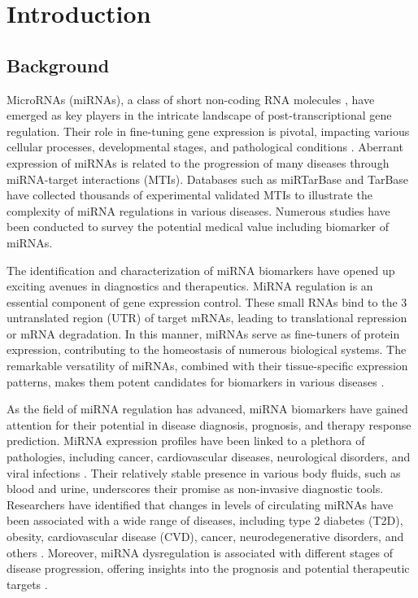 \chapter{Introduction}
\label{chp:introduction}

\section{Background}

MicroRNAs (miRNAs), a class of short non-coding RNA molecules \cite{bartel2004microrna}, have emerged as key players in the intricate landscape of post-transcriptional gene regulation. Their role in fine-tuning gene expression is pivotal, impacting various cellular processes, developmental stages, and pathological conditions \cite{bartel2004microrna,balasubr2013developm}. Aberrant expression of miRNAs is related to the progression of many diseases through miRNA-target interactions (MTIs). Databases such as miRTarBase \cite{huang2022mirtarba} and TarBase \cite{karagkou2018diana} have collected thousands of experimental validated MTIs to illustrate the complexity of miRNA regulations in various diseases. Numerous studies have been conducted to survey the potential medical value including biomarker of miRNAs.

The identification and characterization of miRNA biomarkers have opened up exciting avenues in diagnostics and therapeutics. MiRNA regulation is an essential component of gene expression control. These small RNAs bind to the 3\textquotesingle{} untranslated region (UTR) of target mRNAs, leading to translational repression or mRNA degradation. In this manner, miRNAs serve as fine-tuners of protein expression, contributing to the homeostasis of numerous biological systems. The remarkable versatility of miRNAs, combined with their tissue-specific expression patterns, makes them potent candidates for biomarkers in various diseases \cite{krol2010widespre}.

As the field of miRNA regulation has advanced, miRNA biomarkers have gained attention for their potential in disease diagnosis, prognosis, and therapy response prediction. MiRNA expression profiles have been linked to a plethora of pathologies, including cancer, cardiovascular diseases, neurological disorders, and viral infections \cite{mori2019extracel}. Their relatively stable presence in various body fluids, such as blood and urine, underscores their promise as non-invasive diagnostic tools. Researchers have identified that changes in levels of circulating miRNAs have been associated with a wide range of diseases, including type 2 diabetes (T2D), obesity, cardiovascular disease (CVD), cancer, neurodegenerative disorders, and others \cite{mori2019extracel}. Moreover, miRNA dysregulation is associated with different stages of disease progression, offering insights into the prognosis and potential therapeutic targets \cite{zhou2018mirnas}.

